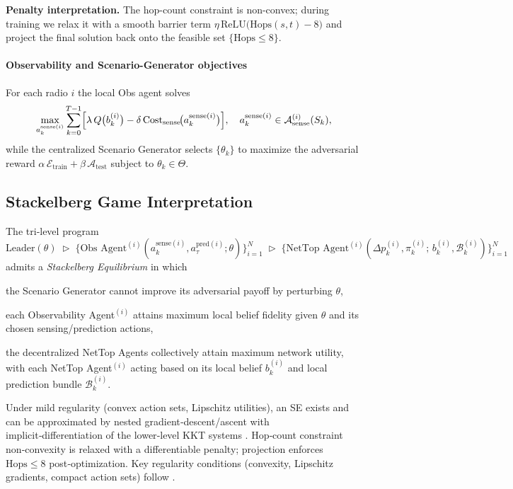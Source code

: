 \documentclass[doc.tex]{subfiles}
\begin{document}
\medskip
\noindent\textbf{Penalty interpretation.}  
The hop-count constraint is non-convex; during training we relax it with
a smooth barrier term
\(\eta\,\mathrm{ReLU}\!\bigl(\mathrm{Hops}(s,t)-8\bigr)\)
and project the final solution back onto the feasible set
\(\{\mathrm{Hops}\!\le 8\}\).


\paragraph{Observability and Scenario-Generator objectives}

For each radio \(i\) the local Obs agent solves
\[
  \max_{a^{\mathrm{sense}(i)}_k}
  \sum_{k=0}^{T-1}
  \Bigl[
    \lambda\,Q\bigl(b_k^{(i)}\bigr)
    -\delta\,\mathrm{Cost}_{\mathrm{sense}}\!\bigl(a^{\mathrm{sense}(i)}_k\bigr)
  \Bigr],
  \quad
  a^{\mathrm{sense}(i)}_k \in \mathcal{A}_{\mathrm{sense}}^{(i)}(S_k),
\]
while the centralized Scenario Generator selects
\(\{\theta_k\}\) to maximize the adversarial reward
\(\alpha\,\mathcal{E}_{\mathrm{train}}+\beta\,\mathcal{A}_{\mathrm{test}}\)
subject to \(\theta_k\in\Theta\).

\subsection{Stackelberg Game Interpretation}

The tri‑level program
\[
  \text{Leader}(\theta)
  \;\triangleright\;
  \{\text{Obs Agent}^{(i)}(a_k^{\text{sense}(i)}, a_\tau^{\text{pred}(i)};\theta)\}_{i=1}^N
  \;\triangleright\;
  \{\text{NetTop Agent}^{(i)}(\Delta p_k^{(i)},\pi_k^{(i)}\!;\,b_k^{(i)}, \mathcal{B}_k^{(i)})\}_{i=1}^N
\]
admits a \emph{Stackelberg Equilibrium} in which

\begin{enumerate*}[label=(\alph*)]
  \item the Scenario Generator cannot improve its adversarial payoff by
        perturbing $\theta$,
  \item each Observability Agent$^{(i)}$ attains maximum local belief fidelity given
        $\theta$ and its chosen sensing/prediction actions, 
  \item the decentralized NetTop Agents collectively attain maximum network utility, with each NetTop Agent$^{(i)}$ acting based on its local belief $b_k^{(i)}$ and local prediction bundle $\mathcal{B}_k^{(i)}$. 
\end{enumerate*}

Under mild regularity (convex action sets, Lipschitz utilities), an SE
exists and can be approximated by nested gradient‑descent/ascent with
implicit‑differentiation of the lower‑level KKT systems
\parencite{fazel2021implicit}. Hop‑count constraint non‑convexity is relaxed with a differentiable penalty; projection enforces \( \text{Hops}\le 8 \) post‑optimization. Key regularity conditions (convexity, Lipschitz gradients, compact action sets) follow \parencite[Fazel et al., 2021, Assumptions 2–4]{fazel2021implicit}.
\end{document}

